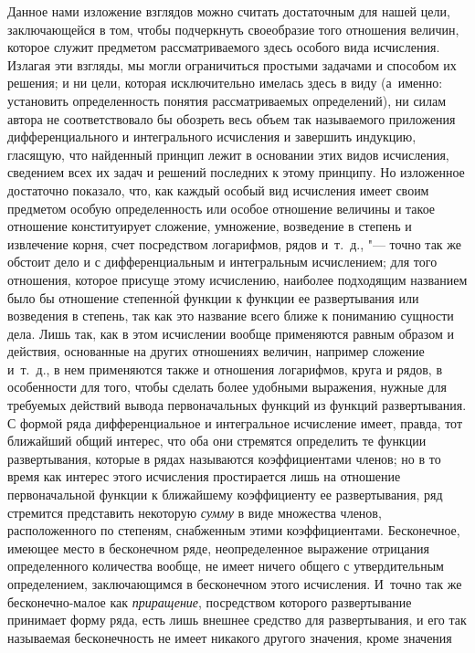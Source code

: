 Данное нами изложение взглядов можно считать достаточным для нашей цели,
заключающейся в том, чтобы подчеркнуть своеобразие того отношения величин,
которое служит предметом рассматриваемого здесь особого вида исчисления.
Излагая эти взгляды, мы могли ограничиться простыми задачами и способом их
решения; и ни цели, которая исключительно имелась здесь в виду (а~именно:
установить определенность понятия рассматриваемых определений), ни силам автора
не соответствовало бы обозреть весь объем так называемого приложения
дифференциального и интегрального исчисления и завершить индукцию, гласящую,
что найденный принцип лежит в основании этих видов исчисления, сведением всех
их задач и решений последних к этому принципу. Но изложенное достаточно
показало, что, как каждый особый вид исчисления имеет своим предметом особую
определенность или особое отношение величины и такое отношение конституирует
сложение, умножение, возведение в степень и извлечение корня, счет посредством
логарифмов, рядов и~т.~д., "--- точно так же обстоит дело и с дифференциальным
и интегральным исчислением; для того отношения, которое присуще этому
исчислению, наиболее подходящим названием было бы отношение степенн\'{о}й
функции к функции ее развертывания или возведения в степень, так как это
название всего ближе к пониманию сущности дела. Лишь так, как в этом исчислении
вообще применяются равным образом и действия, основанные на других отношениях
величин, например сложение и~т.~д., в нем применяются также и отношения
логарифмов, круга и рядов, в особенности для того, чтобы сделать более удобными
выражения, нужные для требуемых действий вывода первоначальных функций из
функций развертывания. С формой ряда дифференциальное и интегральное исчисление
имеет, правда, тот ближайший общий интерес, что оба они стремятся определить те
функции развертывания, которые в рядах называются коэффициентами членов; но в
то время как интерес этого исчисления простирается лишь на отношение
первоначальной функции к ближайшему коэффициенту ее развертывания, ряд
стремится представить некоторую {\em сумму} в виде множества членов,
расположенного по степеням, снабженным этими коэффициентами. Бесконечное,
имеющее место в бесконечном ряде, неопределенное выражение отрицания
определенного количества вообще, не имеет ничего общего с утвердительным
определением, заключающимся в бесконечном этого исчисления. И~точно так же
бесконечно-малое как {\em приращение}, посредством которого развертывание
принимает форму ряда, есть лишь внешнее средство для развертывания, и его так
называемая бесконечность не имеет никакого другого значения, кроме значения

